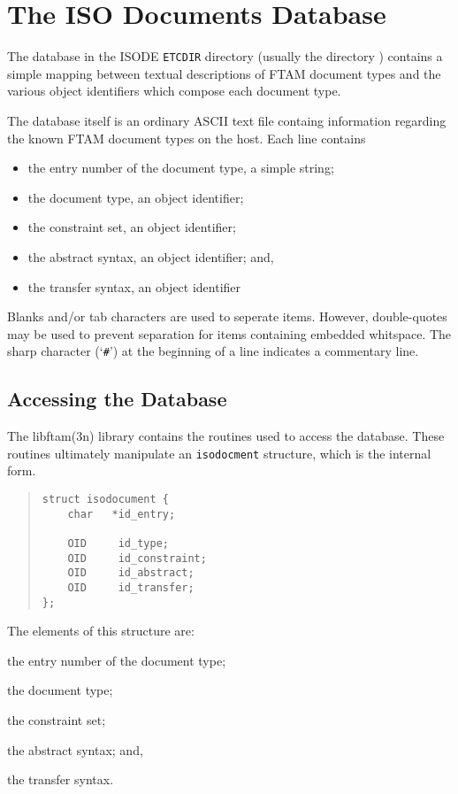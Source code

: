 
\chapter	{The ISO Documents Database}\label{isodocuments}
The database  in the ISODE \verb"ETCDIR" directory
(usually the directory )
contains a simple mapping between
textual descriptions of FTAM document types and the various object
identifiers which compose each document type.

The database itself is an ordinary ASCII text file containg information
regarding the known FTAM document types on the host.
Each line contains
\begin{itemize}
\item	the entry number of the document type, a simple string;

\item	the document type, an object identifier;

\item	the constraint set, an object identifier;

\item	the abstract syntax, an object identifier;
and,

\item	the transfer syntax, an object identifier
\end{itemize}
Blanks and/or tab characters are used to seperate items.
However, double-quotes may be used to prevent separation for items containing
embedded whitspace.
The sharp character (`\verb"#"') at the beginning of a line indicates a
commentary line.

\section	{Accessing the Database}
The \man libftam(3n) library contains the routines used to access the database.
These routines ultimately manipulate an \verb"isodocment" structure,
which is the internal form.
\begin{quote}\small\begin{verbatim}
struct isodocument {
    char   *id_entry;

    OID     id_type;
    OID     id_constraint;
    OID     id_abstract;
    OID     id_transfer;
};
\end{verbatim}\end{quote}
The elements of this structure are:
\begin{describe}
\item[\verb"id\_entry":] the entry number of the document type;

\item[\verb"id\_type":] the document type;

\item[\verb"id\_constraint":] the constraint set;

\item[\verb"id\_abstract":] the abstract syntax;
and,

\item[\verb"id\_transfer":] the transfer syntax.
\end{describe}


